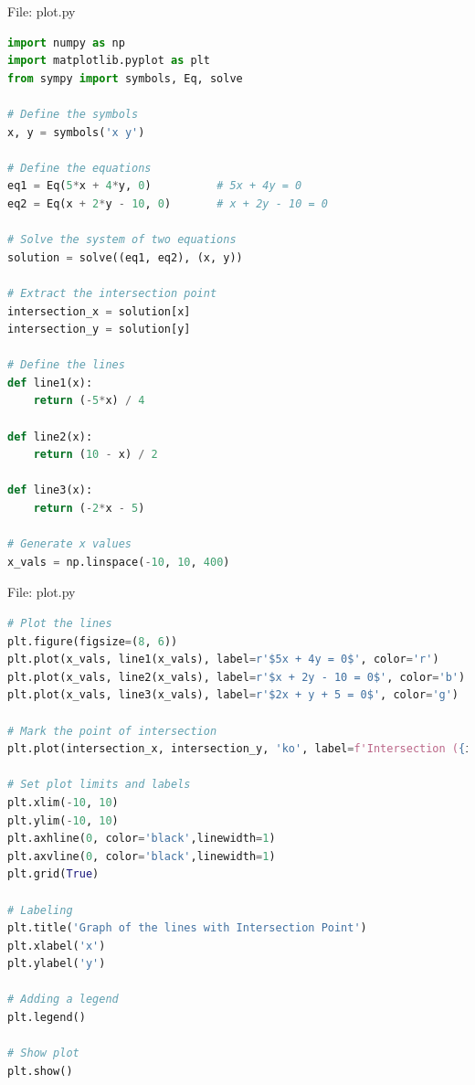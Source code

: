 \documentclass{beamer}
\numberwithin{equation}{section}
\theoremstyle{remark}
\begin{document}
\begin{frame}[fragile]{File: plot.py}
\begin{lstlisting}[language=Python]
import numpy as np
import matplotlib.pyplot as plt
from sympy import symbols, Eq, solve

# Define the symbols
x, y = symbols('x y')

# Define the equations
eq1 = Eq(5*x + 4*y, 0)          # 5x + 4y = 0
eq2 = Eq(x + 2*y - 10, 0)       # x + 2y - 10 = 0

# Solve the system of two equations
solution = solve((eq1, eq2), (x, y))

# Extract the intersection point
intersection_x = solution[x]
intersection_y = solution[y]

# Define the lines
def line1(x):
    return (-5*x) / 4

def line2(x):
    return (10 - x) / 2

def line3(x):
    return (-2*x - 5)

# Generate x values
x_vals = np.linspace(-10, 10, 400)
\end{lstlisting}
\end{frame}

\begin{frame}[fragile]{File: plot.py}
\begin{lstlisting}[language=Python]
# Plot the lines
plt.figure(figsize=(8, 6))
plt.plot(x_vals, line1(x_vals), label=r'$5x + 4y = 0$', color='r')
plt.plot(x_vals, line2(x_vals), label=r'$x + 2y - 10 = 0$', color='b')
plt.plot(x_vals, line3(x_vals), label=r'$2x + y + 5 = 0$', color='g')

# Mark the point of intersection
plt.plot(intersection_x, intersection_y, 'ko', label=f'Intersection ({intersection_x:.2f}, {intersection_y:.2f})')

# Set plot limits and labels
plt.xlim(-10, 10)
plt.ylim(-10, 10)
plt.axhline(0, color='black',linewidth=1)
plt.axvline(0, color='black',linewidth=1)
plt.grid(True)

# Labeling
plt.title('Graph of the lines with Intersection Point')
plt.xlabel('x')
plt.ylabel('y')

# Adding a legend
plt.legend()

# Show plot
plt.show()
\end{lstlisting}
\end{frame}
\end{document}
